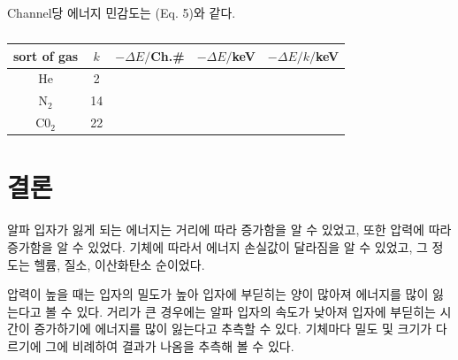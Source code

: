 \documentclass[a4paper, 10pt, nanum]{CSUniSchoolLabReport}
\begin{document}
	Channel당 에너지 민감도는 (Eq. 5)와 같다.

	\begin{table}[htb!]
		\label{tab:4}
		\centering
		\caption{}
		\begin{tabular}{c|cccc}
				\noalign{\smallskip}\noalign{\smallskip}\hline\hline
				sort of gas & $k$ & $-\varDelta E/$Ch.\# & $-\varDelta E/$keV & $-\varDelta E/k/$keV \\
			\hline
				He & 2 &  &  &  \\
				N$_2$ & 14 &  &  &   \\
				C0$_2$ & 22 & & & \\
			\hline
			\hline
		\end{tabular}
	\end{table}



\section{결론}

	알파 입자가 잃게 되는 에너지는 거리에 따라 증가함을 알 수 있었고, 또한 압력에 따라 증가함을 알 수 있었다. 기체에 따라서 에너지 손실값이 달라짐을 알 수 있었고, 그 정도는 헬륨, 질소, 이산화탄소 순이었다.

	압력이 높을 때는 입자의 밀도가 높아 입자에 부딛히는 양이 많아져 에너지를 많이 잃는다고 볼 수 있다. 거리가 큰 경우에는 알파 입자의 속도가 낮아져 입자에 부딛히는 시간이 증가하기에 에너지를 많이 잃는다고 추측할 수 있다. 기체마다 밀도 및 크기가 다르기에 그에 비례하여 결과가 나옴을 추측해 볼 수 있다.



\end{document}
